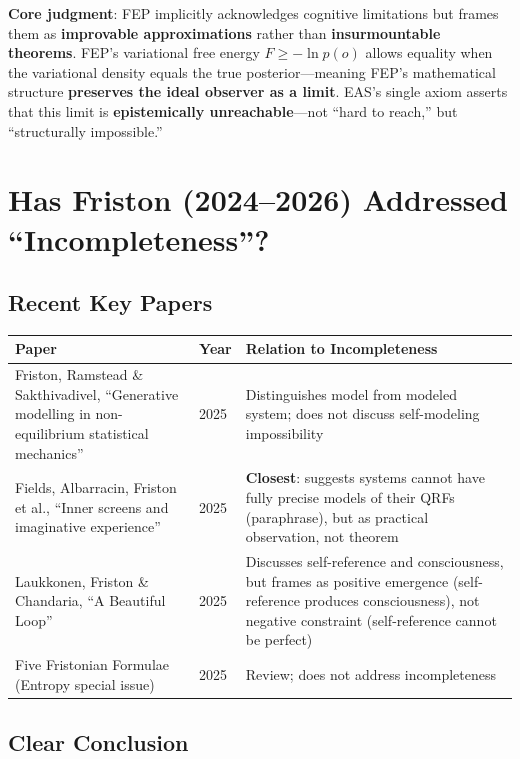 \documentclass[11pt,a4paper]{article}
\begin{document}
\textbf{Core judgment}: FEP implicitly acknowledges cognitive limitations but frames them as \textbf{improvable approximations} rather than \textbf{insurmountable theorems}. FEP's variational free energy $F \geq -\ln p(o)$ allows equality when the variational density equals the true posterior---meaning FEP's mathematical structure \textbf{preserves the ideal observer as a limit}. EAS's single axiom asserts that this limit is \textbf{epistemically unreachable}---not ``hard to reach,'' but ``structurally impossible.''

\section{Has Friston (2024--2026) Addressed ``Incompleteness''?}

\subsection{Recent Key Papers}

\begin{center}
\begin{tabular}{@{}llp{8cm}@{}}
\toprule
\textbf{Paper} & \textbf{Year} & \textbf{Relation to Incompleteness} \\
\midrule
Friston, Ramstead \& Sakthivadivel, ``Generative modelling in non-equilibrium statistical mechanics'' & 2025 & Distinguishes model from modeled system; does not discuss self-modeling impossibility \\
Fields, Albarracin, Friston et al., ``Inner screens and imaginative experience'' & 2025 & \textbf{Closest}: suggests systems cannot have fully precise models of their QRFs (paraphrase), but as practical observation, not theorem \\
Laukkonen, Friston \& Chandaria, ``A Beautiful Loop'' & 2025 & Discusses self-reference and consciousness, but frames as positive emergence (self-reference produces consciousness), not negative constraint (self-reference cannot be perfect) \\
Five Fristonian Formulae (Entropy special issue) & 2025 & Review; does not address incompleteness \\
\bottomrule
\end{tabular}
\end{center}

\subsection{Clear Conclusion}
\end{document}
